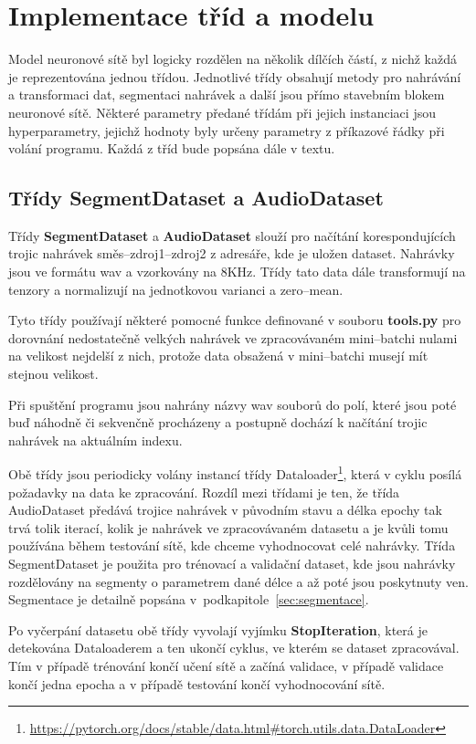 \section{Implementace tříd a modelu}
Model neuronové sítě byl logicky rozdělen na několik dílčích částí, z nichž každá je reprezentována jednou třídou. Jednotlivé třídy obsahují metody pro nahrávání a transformaci dat, segmentaci nahrávek a další jsou přímo stavebním blokem neuronové sítě. Některé parametry předané třídám při jejich instanciaci jsou hyperparametry, jejichž hodnoty byly určeny parametry z příkazové řádky při volání programu. Každá z tříd bude popsána dále v textu.


\subsection*{Třídy SegmentDataset a AudioDataset}
Třídy \textbf{SegmentDataset} a \textbf{AudioDataset} slouží pro načítání korespondujících trojic nahrávek směs--zdroj1--zdroj2 z adresáře, kde je uložen dataset. Nahrávky jsou ve formátu wav a vzorkovány na 8KHz. Třídy tato data dále transformují na tenzory a normalizují na jednotkovou varianci a zero--mean. 

Tyto třídy používají některé pomocné funkce definované v souboru \textbf{tools.py} pro dorovnání nedostatečně velkých nahrávek ve zpracovávaném mini--batchi nulami na velikost nejdelší z nich, protože data obsažená v mini--batchi musejí mít stejnou velikost.

Při spuštění programu jsou nahrány názvy wav souborů do polí, které jsou poté buď náhodně či sekvenčně procházeny a postupně dochází k načítání trojic nahrávek na aktuálním indexu. 

Obě třídy jsou periodicky volány instancí třídy Dataloader\footnote{\url{https://pytorch.org/docs/stable/data.html\#torch.utils.data.DataLoader}}, která v cyklu posílá požadavky na data ke zpracování. Rozdíl mezi třídami je ten, že třída AudioDataset předává trojice nahrávek v původním stavu a délka epochy tak trvá tolik iterací, kolik je nahrávek ve zpracovávaném datasetu a je kvůli tomu používána během testování sítě, kde chceme vyhodnocovat celé nahrávky. Třída SegmentDataset je použita pro trénovací a validační dataset, kde jsou nahrávky rozdělovány na segmenty o parametrem dané délce a až poté jsou poskytnuty ven. Segmentace je detailně popsána v~podkapitole~\ref{sec:segmentace}.

Po vyčerpání datasetu obě třídy vyvolají vyjímku \textbf{StopIteration}, která je detekována Dataloaderem a ten ukončí cyklus, ve kterém se dataset zpracovával. Tím v případě trénování končí učení sítě a začíná validace, v případě validace končí jedna epocha a v případě testování končí vyhodnocování sítě.



